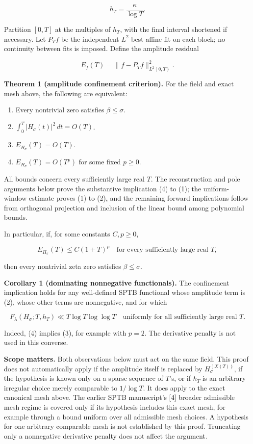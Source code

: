 \documentclass[
  11pt,
]{article}
\providecommand{\tightlist}{%
  \setlength{\itemsep}{0pt}\setlength{\parskip}{0pt}}
\begin{document}
\[
h_T=\frac{\kappa}{\log T}.
\]

Partition \([0,T]\) at the multiples of \(h_T\), with the final interval
shortened if necessary. Let \(P_T f\) be the independent \(L^2\)-best
affine fit on each block; no continuity between fits is imposed. Define
the amplitude residual

\[
E_f(T)=\|f-P_Tf\|_{L^2(0,T)}^2. \tag{2}
\]

\textbf{Theorem 1 (amplitude confinement criterion).} For the field and
exact mesh above, the following are equivalent:

\begin{enumerate}
\def\labelenumi{\arabic{enumi}.}
\tightlist
\item
  Every nontrivial zero satisfies \(\beta\le\sigma\).
\item
  \(\int_0^T|H_\sigma(t)|^2\,dt=O(T)\).
\item
  \(E_{H_\sigma}(T)=O(T)\).
\item
  \(E_{H_\sigma}(T)=O(T^p)\) for some fixed \(p\ge0\).
\end{enumerate}

All bounds concern every sufficiently large real \(T\). The
reconstruction and pole arguments below prove the substantive
implication (4) to (1); the uniform-window estimate proves (1) to (2),
and the remaining forward implications follow from orthogonal projection
and inclusion of the linear bound among polynomial bounds.

In particular, if, for some constants \(C,p\ge0\),

\[
E_{H_\sigma}(T)\le C(1+T)^p
\quad\text{for every sufficiently large real }T, \tag{3}
\]

then every nontrivial zeta zero satisfies \(\beta\le\sigma\).

\textbf{Corollary 1 (dominating nonnegative functionals).} The
confinement implication holds for any well-defined SPTB functional whose
amplitude term is (2), whose other terms are nonnegative, and for which

\[
F_\lambda(H_\sigma;T,h_T)\ll T\log T\log\log T
\quad\text{uniformly for all sufficiently large real }T. \tag{4}
\]

Indeed, (4) implies (3), for example with \(p=2\). The derivative
penalty is not used in this converse.

\textbf{Scope matters.} Both observations below must act on the same
field. This proof does not automatically apply if the amplitude itself
is replaced by \(H_\sigma^{(X(T))}\), if the hypothesis is known only on
a sparse sequence of \(T\)'s, or if \(h_T\) is an arbitrary irregular
choice merely comparable to \(1/\log T\). It does apply to the exact
canonical mesh above. The earlier SPTB manuscript's {[}4{]} broader
admissible mesh regime is covered only if its hypothesis includes this
exact mesh, for example through a bound uniform over all admissible mesh
choices. A hypothesis for one arbitrary comparable mesh is not
established by this proof. Truncating only a nonnegative derivative
penalty does not affect the argument.
\end{document}
